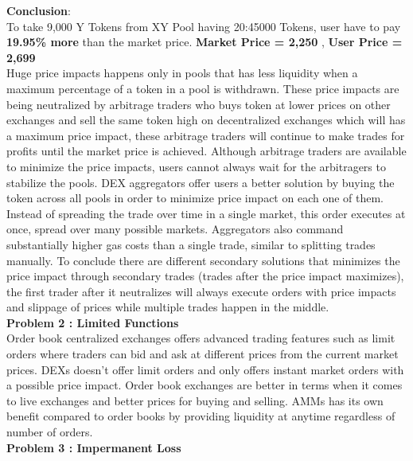\documentclass[letterpaper,11pt]{article}
\begin{document}
\textbf{Conclusion}:\\

To take 9,000 Y Tokens from XY Pool having 20:45000 Tokens, user have to pay \textbf{19.95\% more} than the market price. \textbf{Market Price = 2,250} , \textbf{User Price = 2,699}\\


Huge price impacts happens only in pools that has less liquidity when a maximum percentage of a token in a pool is withdrawn. These price impacts are being neutralized by arbitrage traders who buys token at lower prices on other exchanges and sell the same token high on decentralized exchanges which will has a maximum price impact, these arbitrage traders will continue to make trades for profits until the market price is achieved. Although arbitrage traders are available to minimize the price impacts, users cannot always wait for the arbitragers to stabilize the pools. DEX aggregators offer users a better solution by buying the token across all pools in order to minimize price impact on each one of them. Instead of spreading the trade over time in a single market, this order executes at once, spread over many possible markets. Aggregators also command substantially higher gas costs than a single trade, similar to splitting trades manually. To conclude there are different secondary solutions that minimizes the price impact through secondary trades (trades after the price impact maximizes), the first trader after it neutralizes will always execute orders with price impacts and slippage of prices while multiple trades happen in the middle.\\

\textbf{Problem 2 : Limited Functions}\\

Order book centralized exchanges offers advanced trading features such as limit orders where traders can bid and ask at different prices from the current market prices. DEXs doesn't offer limit orders and only offers instant market orders with a possible price impact. Order book exchanges are better in terms when it comes to live exchanges and better prices for buying and selling. AMMs has its own benefit compared to order books by providing liquidity at anytime regardless of number of orders.\\

\textbf{Problem 3 : Impermanent Loss}\\
\end{document}
